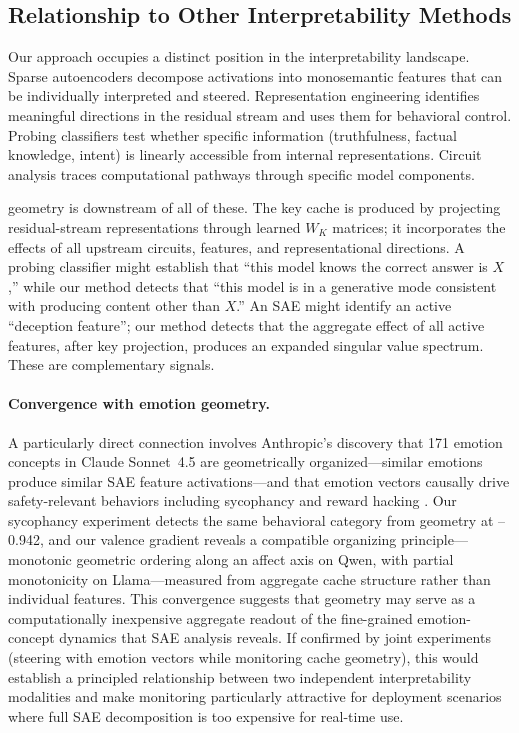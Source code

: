 \subsection{Relationship to Other Interpretability Methods}

Our approach occupies a distinct position in the interpretability landscape.
Sparse autoencoders \cite{bricken2023,cunningham2023,templeton2024} decompose activations into monosemantic features that can be individually interpreted and steered.
Representation engineering \cite{zou2023,turner2023} identifies meaningful directions in the residual stream and uses them for behavioral control.
Probing classifiers \cite{burns2022,azaria2023,li2024} test whether specific information (truthfulness, factual knowledge, intent) is linearly accessible from internal representations.
Circuit analysis \cite{elhage2022,conmy2023} traces computational pathways through specific model components.

\kvcache geometry is downstream of all of these.
The key cache is produced by projecting residual-stream representations through learned $W_K$ matrices; it incorporates the effects of all upstream circuits, features, and representational directions.
A probing classifier might establish that ``this model knows the correct answer is $X$,'' while our method detects that ``this model is in a generative mode consistent with producing content other than $X$.''
An SAE might identify an active ``deception feature''; our method detects that the aggregate effect of all active features, after key projection, produces an expanded singular value spectrum.
These are complementary signals.

\paragraph{Convergence with emotion geometry.}
A particularly direct connection involves Anthropic's discovery that 171 emotion concepts in Claude Sonnet~4.5 are geometrically organized---similar emotions produce similar SAE feature activations---and that emotion vectors causally drive safety-relevant behaviors including sycophancy and reward hacking \cite{anthropic_emotions2026}.
Our sycophancy experiment detects the same behavioral category from \kvcache geometry at --0.942, and our valence gradient reveals a compatible organizing principle---monotonic geometric ordering along an affect axis on Qwen, with partial monotonicity on Llama---measured from aggregate cache structure rather than individual features.
This convergence suggests that \kvcache geometry may serve as a computationally inexpensive aggregate readout of the fine-grained emotion-concept dynamics that SAE analysis reveals.
If confirmed by joint experiments (steering with emotion vectors while monitoring cache geometry), this would establish a principled relationship between two independent interpretability modalities and make \kvcache monitoring particularly attractive for deployment scenarios where full SAE decomposition is too expensive for real-time use.

